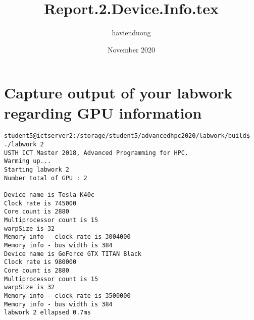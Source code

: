 \documentclass{article}
\title{Report.2.Device.Info.tex}
\author{havienduong }
\date{November 2020}
\begin{document}
\maketitle

\section{Capture output of your labwork regarding GPU information}
\begin{verbatim}
student5@ictserver2:/storage/student5/advancedhpc2020/labwork/build$ ./labwork 2
USTH ICT Master 2018, Advanced Programming for HPC.
Warming up...
Starting labwork 2
Number total of GPU : 2

Device name is Tesla K40c
Clock rate is 745000
Core count is 2880
Multiprocessor count is 15
warpSize is 32
Memory info - clock rate is 3004000
Memory info - bus width is 384
Device name is GeForce GTX TITAN Black
Clock rate is 980000
Core count is 2880
Multiprocessor count is 15
warpSize is 32
Memory info - clock rate is 3500000
Memory info - bus width is 384
labwork 2 ellapsed 0.7ms

\end{verbatim}
\end{document}
